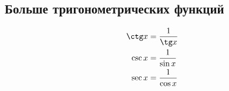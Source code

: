 \subsection*{Больше тригонометрических функций}

\begin{align*}
  \ctg x &= \frac{1}{\tg x}\\
  \csc x &= \frac{1}{\sin x}\\
  \sec x &= \frac{1}{\cos x}
\end{align*}